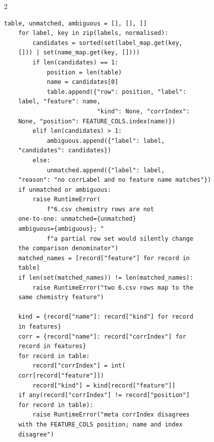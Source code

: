 \begin{multicols}{2}
\begin{Verbatim}[fontsize=\scriptsize]
    table, unmatched, ambiguous = [], [], []
    for label, key in zip(labels, normalised):
        candidates = sorted(set(label_map.get(key,
    [])) | set(name_map.get(key, [])))
        if len(candidates) == 1:
            position = len(table)
            name = candidates[0]
            table.append({"row": position, "label":
    label, "feature": name,
                          "kind": None, "corrIndex":
    None, "position": FEATURE_COLS.index(name)})
        elif len(candidates) > 1:
            ambiguous.append({"label": label,
    "candidates": candidates})
        else:
            unmatched.append({"label": label,
    "reason": "no corrLabel and no feature name matches"})
    if unmatched or ambiguous:
        raise RuntimeError(
            f"6.csv chemistry rows are not
    one-to-one: unmatched={unmatched}
    ambiguous={ambiguous}; "
            f"a partial row set would silently change
    the comparison denominator")
    matched_names = [record["feature"] for record in
    table]
    if len(set(matched_names)) != len(matched_names):
        raise RuntimeError("two 6.csv rows map to the
    same chemistry feature")

    kind = {record["name"]: record["kind"] for record
    in features}
    corr = {record["name"]: record["corrIndex"] for
    record in features}
    for record in table:
        record["corrIndex"] = int(
    corr[record["feature"]])
        record["kind"] = kind[record["feature"]]
    if any(record["corrIndex"] != record["position"]
    for record in table):
        raise RuntimeError("meta corrIndex disagrees
    with the FEATURE_COLS position; name and index
    disagree")


\end{Verbatim}
\end{multicols}

